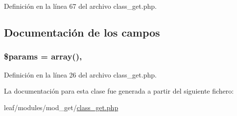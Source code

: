 Definición en la línea 67 del archivo class\-\_\-get.\-php.



\subsection{Documentación de los campos}
\hypertarget{classget_afe68e6fbe7acfbffc0af0c84a1996466}{
\subsubsection[{\$params}]{\setlength{\rightskip}{0pt plus 5cm}\$params = array()\hspace{0.3cm}{\ttfamily [static]}, {\ttfamily [private]}}}\label{classget_afe68e6fbe7acfbffc0af0c84a1996466}


Definición en la línea 26 del archivo class\-\_\-get.\-php.



La documentación para esta clase fue generada a partir del siguiente fichero\-:\begin{DoxyCompactItemize}
\item 
leaf/modules/mod\-\_\-get/\hyperlink{class__get_8php}{class\-\_\-get.\-php}\end{DoxyCompactItemize}
